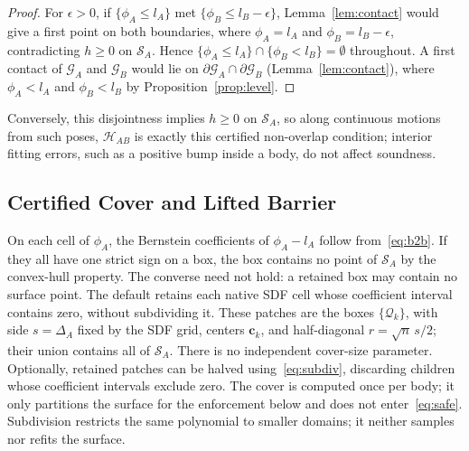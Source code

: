 \documentclass[journal]{IEEEtran}
\theoremstyle{definition}
\begin{document}
\begin{proof}
For $\epsilon>0$, if $\{\phi_A\le l_A\}$ met $\{\phi_B\le l_B-\epsilon\}$, Lemma~\ref{lem:contact} would
give a first point on both boundaries, where $\phi_A=l_A$ and $\phi_B=l_B-\epsilon$, contradicting
$h\ge0$ on $\mathcal S_A$. Hence $\{\phi_A\le l_A\}\cap\{\phi_B<l_B\}=\emptyset$ throughout. A first
contact of $\mathcal G_A$ and $\mathcal G_B$ would lie on $\partial\mathcal G_A\cap\partial\mathcal G_B$
(Lemma~\ref{lem:contact}), where $\phi_A<l_A$ and $\phi_B<l_B$ by Proposition~\ref{prop:level}.
\end{proof}
Conversely, this disjointness implies $h\ge0$ on $\mathcal S_A$, so along continuous motions from
such poses, $\mathcal H_{AB}$ is exactly this certified non-overlap condition; interior fitting
errors, such as a positive bump inside a body, do not affect soundness.

\subsection{Certified Cover and Lifted Barrier}
On each cell of $\phi_A$, the Bernstein coefficients of $\phi_A-l_A$ follow from~\eqref{eq:b2b}. If
they all have one strict sign on a box, the box contains no point of $\mathcal S_A$ by the
convex-hull property. The converse need not hold: a retained box may contain no surface point.
The default retains each native SDF cell whose coefficient interval contains zero, without
subdividing it. These patches are the boxes $\{\mathcal Q_k\}$, with side $s=\Delta_A$ fixed by the SDF
grid, centers $\mathbf c_k$, and half-diagonal $r=\sqrt n\,s/2$; their union contains all of
$\mathcal S_A$. There is no independent cover-size parameter. Optionally, retained patches can be
halved using~\eqref{eq:subdiv}, discarding children whose coefficient intervals exclude zero.
The cover is computed once per body; it only partitions
the surface for the enforcement below and does not enter~\eqref{eq:safe}. Subdivision restricts the
same polynomial to smaller domains; it neither samples nor refits the surface.
\end{document}
